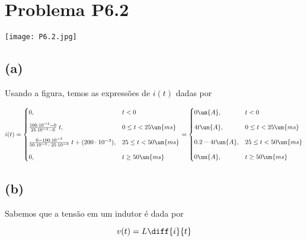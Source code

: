 
\section*{Problema P6.2}

\renewcommand*\thesection{6.2}

\begin{center}
    \texttt{[image: P6.2.jpg]}
\end{center}

\subsection*{(a)}

Usando a figura, temos as expressões de $i(t)$ dadas por

\[ i(t) =
    \begin{cases}
        0,                                                                    & t < 0                 \\
        \noalign{\vskip9pt}
        \frac{100 \cdot 10^{-3} - 0}{25 \cdot 10^{-3} - 0}\;t,                & 0 \leq t < 25 \un{ms} \\
        \noalign{\vskip9pt}
        \frac{0 - 100 \cdot 10^{-3}}{50 \cdot 10^{-3} - 25 \cdot 10^{-3}}\;t + (200 \cdot 10^{-3}), & 25 \leq t < 50 \un{ms} \\
        \noalign{\vskip9pt}
        0,                                                                    & t \geq 50 \un{ms}
    \end{cases}
    =
    \begin{cases}
        0 \un{A},   & t < 0                 \\
        \noalign{\vskip9pt}
        4t \un{A},  & 0 \leq t < 25 \un{ms} \\
        \noalign{\vskip9pt}
        0.2 - 4t \un{A}, & 25 \leq t < 50 \un{ms} \\
        \noalign{\vskip9pt}
        0 \un{A},   & t \geq 50 \un{ms}
    \end{cases}
\]

\subsection*{(b)}

Sabemos que a tensão em um indutor é dada por   

\begin{equation}\label{eq:6.2.1}
    v(t) = L\diff{i}{t}
\end{equation}

